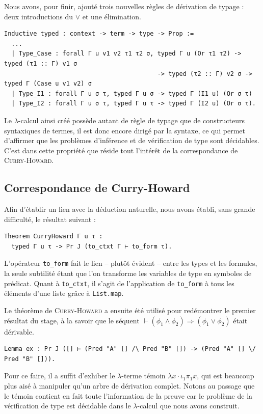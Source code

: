 \documentclass[a4paper]{article}
\theoremstyle{remark}
\theoremstyle{remark}
\theoremstyle{remark}
\theoremstyle{definition}
\theoremstyle{definition}
\theoremstyle{definition}
\begin{document}
Nous avons, pour finir, ajouté trois nouvelles règles de dérivation de typage : deux introductions du $\vee$ et une élimination.
\begin{verbatim}
Inductive typed : context -> term -> type -> Prop :=
  ...
  | Type_Case : forall Γ u v1 v2 τ1 τ2 σ, typed Γ u (Or τ1 τ2) -> typed (τ1 :: Γ) v1 σ
                                          -> typed (τ2 :: Γ) v2 σ -> typed Γ (Case u v1 v2) σ
  | Type_I1 : forall Γ u σ τ, typed Γ u σ -> typed Γ (I1 u) (Or σ τ)
  | Type_I2 : forall Γ u σ τ, typed Γ u τ -> typed Γ (I2 u) (Or σ τ).
\end{verbatim}
\smallskip

Le $\lambda$-calcul ainsi créé possède autant de règle de typage que de constructeurs syntaxiques de termes, il est donc encore dirigé par la syntaxe, ce qui permet d'affirmer que les problèmes d'inférence et de vérification de type sont décidables. C'est dans cette propriété que réside tout l'intérêt de la correspondance de \textsc{Curry-Howard}.

\subsection{Correspondance de {\sc Curry-Howard}}

Afin d'établir un lien avec la déduction naturelle, nous avons établi, sans grande difficulté, le résultat suivant :
\begin{verbatim}
Theorem CurryHoward Γ u τ :
  typed Γ u τ -> Pr J (to_ctxt Γ ⊢ to_form τ).
\end{verbatim}
L'opérateur \verb+to_form+ fait le lien -- plutôt évident -- entre les types et les formules, la seule subtilité étant que l'on transforme les variables de type en symboles de prédicat. Quant à \verb+to_ctxt+, il s'agit de l'application de \verb+to_form+ à tous les éléments d'une liste grâce à \verb+List.map+.
\smallskip

Le théorème de \textsc{Curry-Howard} a ensuite été utilisé pour redémontrer le premier résultat du stage, à la savoir que le séquent $\vdash (\phi_1 \wedge \phi_2) \Rightarrow (\phi_1 \vee \phi_2)$ était dérivable.
\begin{verbatim}
Lemma ex : Pr J ([] ⊢ (Pred "A" [] /\ Pred "B" []) -> (Pred "A" [] \/ Pred "B" [])).
\end{verbatim}
Pour ce faire, il a suffit d'exhiber le $\lambda$-terme témoin $\lambda x \cdot \iota_1 \pi_1 x$, qui est beaucoup plus aisé à manipuler qu'un arbre de dérivation complet. Notons au passage que le témoin contient en fait toute l'information de la preuve car le problème de la vérification de type est décidable dans le $\lambda$-calcul que nous avons construit.
\end{document}
